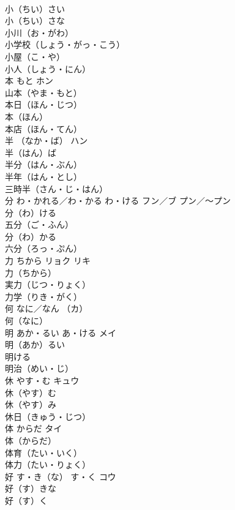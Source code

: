 \documentclass[8pt]{extreport}
\begin{document}
\begin{CJK}{UTF8}{min}
\\	小（ちい）さい　
\\	小（ちい）さな　
\\	小川（お・がわ）　
\\	小学校（しょう・がっ・こう）　
\\	小屋（こ・や）　
\\	小人（しょう・にん）　
\\	本	もと	ホン	
\\	山本（やま・もと）　
\\	本日（ほん・じつ）　
\\	本（ほん）　
\\	本店（ほん・てん）　
\\	半	（なか・ば）	ハン	
\\	半（はん）ば　
\\	半分（はん・ぶん）　
\\	半年（はん・とし）　
\\	三時半（さん・じ・はん）　
\\	分	わ・かれる／わ・かる わ・ける	フン／ブ プン／～プン	
\\	分（わ）ける　
\\	五分（ご・ふん）　
\\	分（わ）かる　
\\	六分（ろっ・ぷん）　
\\	力	ちから	リョク リキ	
\\	力（ちから）　
\\	実力（じつ・りょく）　
\\	力学（りき・がく）　
\\	何	なに／なん	（カ）	
\\	何（なに）　
\\	明	あか・るい あ・ける	メイ	
\\	明（あか）るい　
\\	明ける　
\\	明治（めい・じ）　
\\	休	やす・む	キュウ	
\\	休（やす）む　
\\	休（やす）み　
\\	休日（きゅう・じつ）　
\\	体	からだ	タイ	
\\	体（からだ）　
\\	体育（たい・いく）　
\\	体力（たい・りょく）　
\\	好	す・き（な） す・く	コウ	
\\	好（す）きな　
\\	好（す）く　

\end{CJK}
\end{document}
